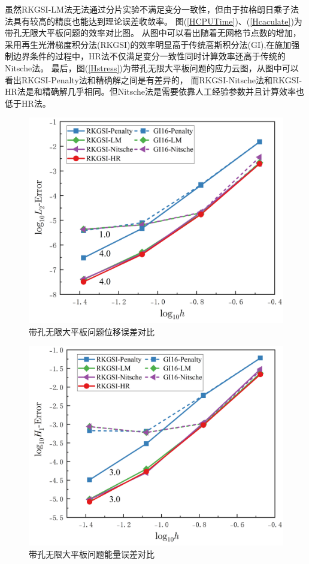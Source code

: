 虽然RKGSI-LM法无法通过分片实验不满足变分一致性，但由于拉格朗日乘子法法具有较高的精度也能达到理论误差收敛率。
图(\ref{HCPUTime})、(\ref{Hcaculate})为带孔无限大平板问题的效率对比图。
从图中可以看出随着无网格节点数的增加，采用再生光滑梯度积分法(RKGSI)的效率明显高于传统高斯积分法(GI),在施加强制边界条件的过程中，HR法不仅满足变分一致性同时计算效率还高于传统的Nitsche法。
最后，图(\ref{Hstress})为带孔无限大平板问题的应力云图，从图中可以看出RKGSI-Penalty法和精确解之间是有差异的，
而RKGSI-Nitsche法和RKGSI-HR法是和精确解几乎相同。但Nitsche法是需要依靠人工经验参数并且计算效率也低于HR法。
\begin{figure}[H]
    \centering
    \includegraphics[scale=0.5]{figure/E/hole/L2.png}
    \caption{带孔无限大平板问题位移误差对比}\label{HL2}
\end{figure}
\begin{figure}[H]
    \centering
    \includegraphics[scale=0.5]{figure/E/hole/H1.png}
    \caption{带孔无限大平板问题能量误差对比}\label{HH1}
\end{figure}
